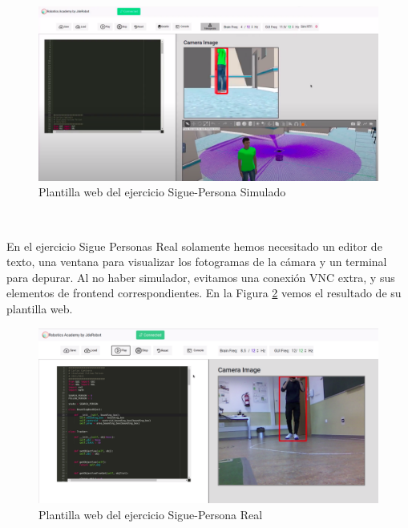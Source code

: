 \begin{figure} [H]
  \begin{center}
    \includegraphics[width=15cm]{imagenes/cap5/plantilla-web-simulated-follow-person.png}
  \end{center}
  \caption[Plantilla web del ejercicio Sigue-Persona Simulado]{Plantilla web del ejercicio Sigue-Persona Simulado}
  \label{fig:plantilla_web_simulated_follow_person}
\end{figure}\

En el ejercicio Sigue Personas Real solamente hemos necesitado un editor de texto, una ventana para visualizar los fotogramas de la cámara y un terminal para depurar. Al no haber simulador, evitamos una conexión VNC extra, y sus elementos de frontend correspondientes. En la Figura \ref{fig:plantilla_web_real_follow_person} vemos el resultado de su plantilla web.\\

\begin{figure} [H]
  \begin{center}
    \includegraphics[width=15cm]{imagenes/cap5/plantilla-web-real-follow-person.png}
  \end{center}
  \caption[Plantilla web del ejercicio Sigue-Persona Real]{Plantilla web del ejercicio Sigue-Persona Real}
  \label{fig:plantilla_web_real_follow_person}
\end{figure}

